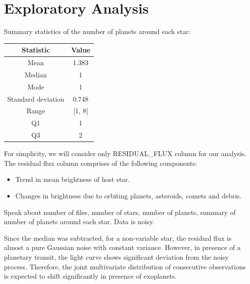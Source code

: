 \documentclass[%
aip,
amsmath,amssymb,
reprint,%
]{revtex4-1}
\begin{document}
\section{Exploratory Analysis}

Summary statistics of the number of planets around each star:

\begin{center}
 \begin{tabular}{| c | c |} 
 \hline
 \textbf{Statistic} & \textbf{Value}\\ [0.5 ex]
 \hline
 Mean & 1.383 \\ 
 \hline
 Median & 1 \\
 \hline
 Mode & 1 \\
 \hline
 Standard deviation & 0.748 \\
 \hline
 Range & [1, 8] \\
 \hline
 Q1 & 1 \\
 \hline
 Q3 & 2 \\ [1ex] 
 \hline
 \end{tabular}
\end{center}

For simplicity, we will consider only RESIDUAL\_FLUX column for our analysis. The residual flux column comprises of the following components:

\begin{itemize}
  \item Trend in mean brightness of host star.
  \item Changes in brightness due to orbiting planets, asteroids, comets and debris.
\end{itemize}

Speak about number of files, number of stars, number of planets, summary of number of planets around each star. Data is noisy.

Since the median was subtracted, for a non-variable star, the residual flux is almost a pure Gaussian noise with constant variance. However, in presence of a planetary transit, the light curve shows significant deviation from the noisy process. Therefore, the joint multivariate distribution of consecutive observations is expected to shift significantly in presence of exoplanets.
\end{document}
